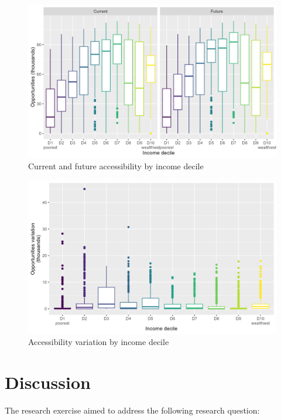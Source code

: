 \documentclass[12pt, a4paper]{report}
\begin{document}
\begin{figure}[ht]
    \centering
    \includegraphics[width=13cm]{Data/Results/Images/Boxplot_Access_All_by_income_decile.png}
    \caption{Current and future accessibility by income decile}
    \label{fig:Access_Income_Before_After}
\end{figure}

\begin{figure}[ht]
    \centering
    \includegraphics[width=13cm]{Data/Results/Images/Boxplot_Access_diff_by_income_decile.png}
    \caption{Accessibility variation by income decile}
    \label{fig:Access_Income_Before_After_Variation}
\end{figure}



\chapter{Discussion} \label{Chap6}

The research exercise aimed to address the following research question: 
\end{document}
